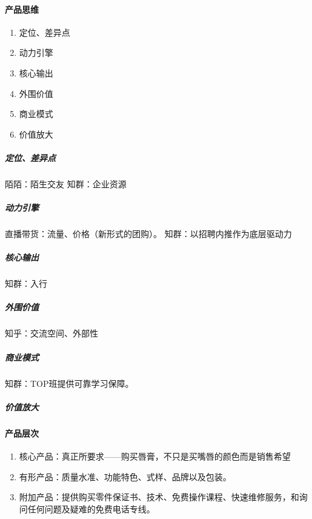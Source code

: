 \documentclass[letterpaper,11pt,english]{sphinxmanual}
\begin{document}
\paragraph{产品思维}
\label{\detokenize{chapter_introduction/Product:id16}}\begin{enumerate}
%
\item {} 
定位、差异点

\item {} 
动力引擎

\item {} 
核心输出

\item {} 
外围价值

\item {} 
商业模式

\item {} 
价值放大

\end{enumerate}


\subparagraph{定位、差异点}
\label{\detokenize{chapter_introduction/Product:id17}}
陌陌：陌生交友 知群：企业资源


\subparagraph{动力引擎}
\label{\detokenize{chapter_introduction/Product:id18}}
直播带货：流量、价格（新形式的团购）。 知群：以招聘内推作为底层驱动力


\subparagraph{核心输出}
\label{\detokenize{chapter_introduction/Product:id19}}
知群：入行


\subparagraph{外围价值}
\label{\detokenize{chapter_introduction/Product:id20}}
知乎：交流空间、外部性


\subparagraph{商业模式}
\label{\detokenize{chapter_introduction/Product:id21}}
知群：TOP班提供可靠学习保障。


\subparagraph{价值放大}
\label{\detokenize{chapter_introduction/Product:id22}}

\paragraph{产品层次}
\label{\detokenize{chapter_introduction/Product:id23}}\begin{enumerate}
%
\item {} 
核心产品：真正所要求——购买唇膏，不只是买嘴唇的颜色而是销售希望

\item {} 
有形产品：质量水准、功能特色、式样、品牌以及包装。

\item {} 
附加产品：提供购买零件保证书、技术、免费操作课程、快速维修服务，和询问任何问题及疑难的免费电话专线。

\end{enumerate}
\end{document}
